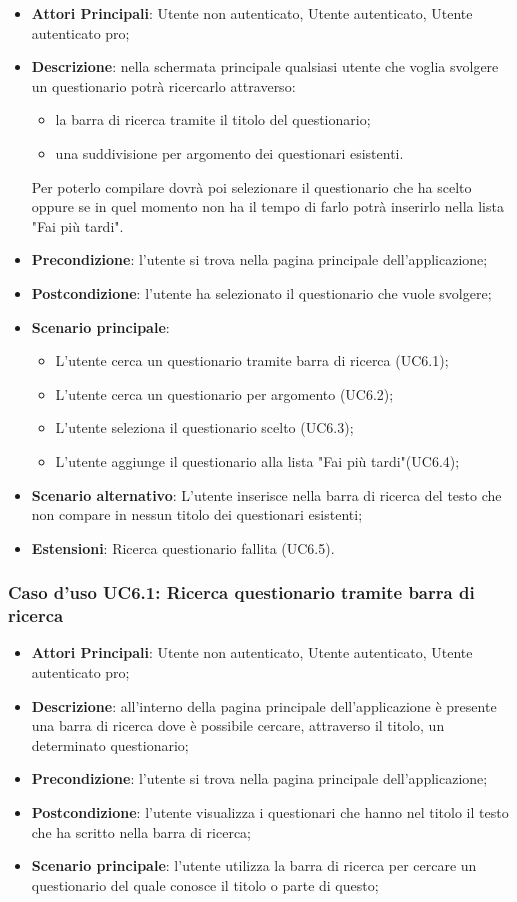 \begin{itemize}
\item\textbf{Attori Principali}: Utente non autenticato, Utente autenticato, Utente autenticato pro;
\item\textbf{Descrizione}: nella schermata principale qualsiasi utente che voglia svolgere un questionario potrà ricercarlo attraverso:
\begin{itemize}
\item la barra di ricerca tramite il titolo del questionario;
\item una suddivisione per argomento dei questionari esistenti.
\end{itemize}
Per poterlo compilare dovrà poi selezionare il questionario che ha scelto oppure se in quel momento non ha il tempo di farlo potrà inserirlo nella lista "Fai più tardi".	
\item\textbf{Precondizione}: l'utente si trova nella pagina principale dell'applicazione;
\item\textbf{Postcondizione}: l'utente ha selezionato il questionario che vuole svolgere;
\item\textbf{Scenario principale}:
\begin{itemize}
\item L'utente cerca un questionario tramite barra di ricerca (UC6.1);
\item L'utente cerca un questionario per argomento (UC6.2);
\item L'utente seleziona il questionario scelto (UC6.3);
\item L'utente aggiunge il questionario alla lista "Fai più tardi"(UC6.4);
\end{itemize}
\item\textbf{Scenario alternativo}: L'utente inserisce nella barra di ricerca del testo che non compare in nessun titolo dei questionari esistenti;
\item\textbf{Estensioni}: Ricerca questionario fallita (UC6.5).
\end{itemize}

\subsubsection{Caso d'uso UC6.1: Ricerca questionario tramite barra di ricerca}
\begin{itemize}
\item\textbf{Attori Principali}: Utente non autenticato, Utente autenticato, Utente autenticato pro;
\item\textbf{Descrizione}: all'interno della pagina principale dell'applicazione è presente una barra di ricerca dove è possibile cercare, attraverso il titolo, un determinato questionario;
\item\textbf{Precondizione}: l'utente si trova nella pagina principale dell'applicazione;
\item\textbf{Postcondizione}: l'utente visualizza i questionari che hanno nel titolo il testo che ha scritto nella barra di ricerca;
\item\textbf{Scenario principale}: l'utente utilizza la barra di ricerca per cercare un questionario del quale conosce il titolo o parte di questo;
\end{itemize}

